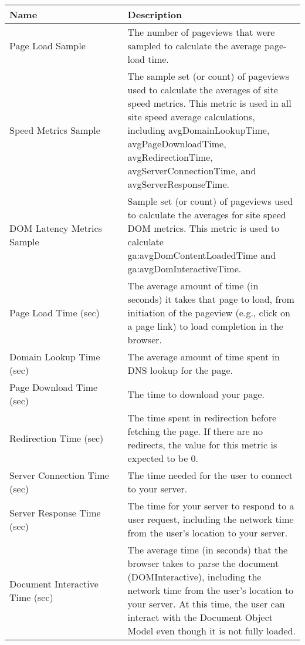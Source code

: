 \begin{center}
\small

	\begin{tabular}{ p{0.4\linewidth} | p{0.6\linewidth} }
	Name & Description  \\ 
	\hline
	Page Load Sample & The number of pageviews that were sampled to calculate the average page-load time.  \\
	
	Speed Metrics Sample & The sample set (or count) of pageviews used to calculate the averages of site speed metrics. This metric is used in all site speed average calculations, including avgDomainLookupTime, avgPageDownloadTime, avgRedirectionTime, avgServerConnectionTime, and avgServerResponseTime.  \\
	
	DOM Latency Metrics Sample & Sample set (or count) of pageviews used to calculate the averages for site speed DOM metrics. This metric is used to calculate ga:avgDomContentLoadedTime and ga:avgDomInteractiveTime.  \\

	Page Load Time (sec) & The average amount of time (in seconds) it takes that page to load, from initiation of the pageview (e.g., click on a page link) to load completion in the browser.  \\
	
	Domain Lookup Time (sec) & The average amount of time spent in DNS lookup for the page.  \\
	
	Page Download Time (sec) & The time to download your page.  \\
	
	Redirection Time (sec) & The time spent in redirection before fetching the page. If there are no redirects, the value for this metric is expected to be 0.  \\
	
	Server Connection Time (sec) & The time needed for the user to connect to your server.  \\

	Server Response Time (sec) & The time for your server to respond to a user request, including the network time from the user's location to your server.  \\
	
	Document Interactive Time (sec) & The average time (in seconds) that the browser takes to parse the document (DOMInteractive), including the network time from the user's location to your server. At this time, the user can interact with the Document Object Model even though it is not fully loaded.  \\


\end{tabular}
\end{center}
